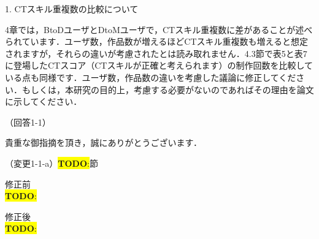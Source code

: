 \documentclass{jarticle} %
\newcommand{\todo}[1]{\colorbox{yellow}{{\bf TODO}:}{\color{blue}{\textbf{[#1]}}}}
\def\subsection#1{ \vspace{1pc} {\gt #1} }
\begin{document}
1. CTスキル重複数の比較について

4章では，BtoDユーザとDtoMユーザで，CTスキル重複数に差があることが述べられています．ユーザ数，作品数が増えるほどCTスキル重複数も増えると想定されますが，それらの違いが考慮されたとは読み取れません．4.3節で表5と表7に登場したCTスコア（CTスキルが正確と考えられます）の制作回数を比較している点も同様です．ユーザ数，作品数の違いを考慮した議論に修正してください．もしくは，本研究の目的上，考慮する必要がないのであればその理由を論文に示してください．

\subsection{（回答1-1）}

貴重な御指摘を頂き，誠にありがとうございます．



\subsection{（変更1-1-a）\todo{hoge}節 }
\vspace{-0.3cm}
\begin{description}
\item 修正前\\
\phantom{　}
\todo{hoge}
\vspace{-0.3cm}
\item 修正後\\
\phantom{　}
\todo{hoge}
\end{description}    
      
\end{document}
